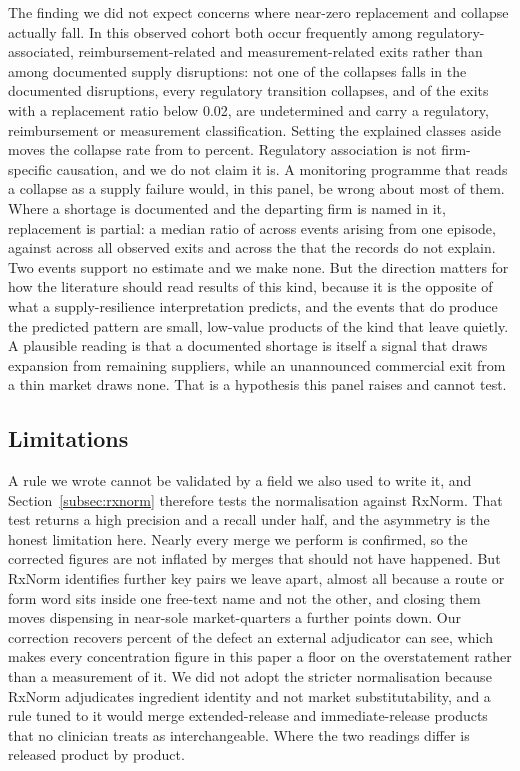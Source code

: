 \documentclass[pdflatex,sn-vancouver-num,Numbered]{sn-jnl}
\begin{document}
The finding we did not expect concerns where near-zero replacement and collapse actually fall.
In this observed cohort both occur frequently among regulatory-associated, reimbursement-related
and measurement-related exits rather than among documented supply disruptions: not one of the
\nCollPooledColl collapses falls in the \nCollSupplyN documented disruptions, every regulatory
transition collapses, and of the \nNearZeroN exits with a replacement ratio below 0.02,
\nNearZeroUndet are undetermined and \nNearZeroExplained carry a regulatory, reimbursement or
measurement classification. Setting the explained classes aside moves the collapse rate from
\nCollPooledRate to \nCollRemRate percent. Regulatory association is not firm-specific
causation, and we do not claim it is. A monitoring programme that reads
a collapse as a supply failure would, in this panel, be wrong about most of them. Where a shortage is documented and the departing firm is named in it,
replacement is partial: a median ratio of \nSupplyMedian across \nCauseSupplyW events arising
from one episode, against \nAllMedian across all \nCauseTotal observed exits and
\nExNotSupplyMedian across the \nExNotSupplyNW that the records do not explain. Two events
support no estimate and we make none. But the direction matters for how the literature should read results
of this kind, because it is the opposite of what a supply-resilience interpretation predicts, and
the events that do produce the predicted pattern are small, low-value products of the kind that
leave quietly. A plausible reading is that a documented shortage is itself a signal that draws
expansion from remaining suppliers, while an unannounced commercial exit from a thin market draws
none. That is a hypothesis this panel raises and cannot test.

\subsection{Limitations}\label{subsec:limits}

A rule we wrote cannot be validated by a field we also used to write it, and
Section~\ref{subsec:rxnorm} therefore tests the normalisation against RxNorm. That test
returns a high precision and a recall under half, and the asymmetry is the honest limitation
here. Nearly every merge we perform is confirmed, so the corrected figures are not inflated by
merges that should not have happened. But RxNorm identifies \nRxPairsMissed further key pairs
we leave apart, almost all because a route or form word sits inside one free-text name and not
the other, and closing them moves dispensing in near-sole market-quarters a further
\nSpecDDelta points down. Our correction recovers \nSpecDShareOfTotal percent of the defect an
external adjudicator can see, which makes every concentration figure in this paper a floor on
the overstatement rather than a measurement of it. We did not adopt the stricter normalisation
because RxNorm adjudicates ingredient identity and not market substitutability, and a rule
tuned to it would merge extended-release and immediate-release products that no clinician
treats as interchangeable. Where the two readings differ is released product by product.
\end{document}
